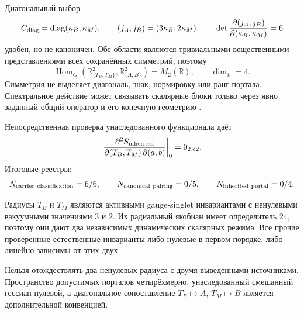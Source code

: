 Диагональный выбор
\begin{equation}
 C_{\rm diag}=\operatorname{diag}(\kappa_B,\kappa_M),
 \qquad (j_A,j_B)=(3\kappa_B,2\kappa_M),
 \qquad \det\frac{\partial(j_A,j_B)}
 {\partial(\kappa_B,\kappa_M)}=6
 \label{eq:v8-two-source-carriers-diagonal-convention}
\end{equation}
удобен, но не каноничен. Обе области являются тривиальными вещественными
представлениями всех сохранённых симметрий, поэтому
\begin{equation}
 \operatorname{Hom}_{G}(\mathbb R^2_{\{T_B,T_M\}},
 \mathbb R^2_{\{A,B\}})=M_2(\mathbb R),
 \qquad \dim_{\mathbb R}=4.
 \label{eq:v8-two-source-carriers-hom-space}
\end{equation}
Симметрия не выделяет диагональ, знак, нормировку или ранг портала.
Спектральное действие может связывать скалярные блоки только через явно
заданный общий оператор и его конечную геометрию
\cite{v8-two-source-carriers-stephan,v8-two-source-carriers-krajewski}.

Непосредственная проверка унаследованного функционала даёт
\begin{equation}
 \left.\frac{\partial^2S_{\rm inherited}}
 {\partial(T_B,T_M)\,\partial(a,b)}\right|_0=0_{2\times2}.
 \label{eq:v8-two-source-carriers-inherited-zero}
\end{equation}
Итоговые реестры:
\begin{equation}
 N_{\rm carrier\ classification}=6/6,
 \qquad N_{\rm canonical\ pairing}=0/5,
 \qquad N_{\rm inherited\ portal}=0/4.
 \label{eq:v8-two-source-carriers-ledgers}
\end{equation}

\begin{theorem}
Радиусы $T_B$ и $T_M$ являются активными gauge-singlet инвариантами с
ненулевыми вакуумными значениями $3$ и $2$. Их радиальный якобиан имеет
определитель $24$, поэтому они дают два независимых динамических скалярных
режима. Все прочие проверенные естественные инварианты либо нулевые в
первом порядке, либо линейно зависимы от этих двух.
\end{theorem}

\begin{nogocriterion}
Нельзя отождествлять два ненулевых радиуса с двумя выведенными источниками.
Пространство допустимых порталов четырёхмерно, унаследованный смешанный
гессиан нулевой, а диагональное сопоставление $T_B\mapsto A$,
$T_M\mapsto B$ является дополнительной конвенцией.
\end{nogocriterion}

